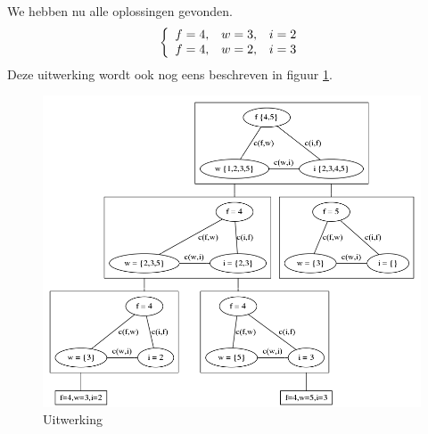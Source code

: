 \documentclass[alternative-exam.tex]{subfiles}
\begin{document}
We hebben nu alle oplossingen gevonden.
\[
\left\lbrace
\begin{array}{c c c}
f=4,& w=3,& i=2\\
f=4,& w=2,& i=3\\
\end{array}
\right.
\] 
Deze uitwerking wordt ook nog eens beschreven in figuur \ref{uitwerking}.
\begin{figure}
[p]
\centering
\caption{Uitwerking}
\label{uitwerking}
\includegraphics[scale=0.4]{resources/graphs/uitwerking.png}
\end{figure}
\end{document}
